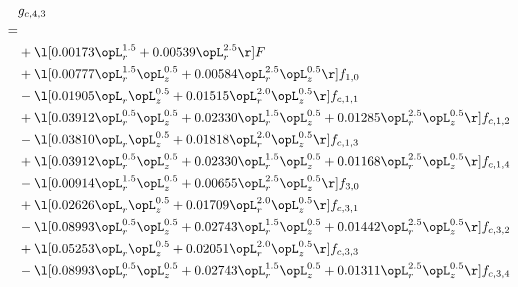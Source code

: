 \begin{alignat}{2} 
\label{eq:g_43_0} 
& g_{c,4,3} \nonumber \\ 
 = \\ 
& + \l[  0.00173 \opL_r^{1.5} +  0.00539 \opL_r^{2.5}  \r] F \nonumber \\ 
& + \l[  0.00777 \opL_r^{1.5} \opL_z^{0.5} +  0.00584 \opL_r^{2.5} \opL_z^{0.5}  \r] f_{1,0} \nonumber \\ 
& - \l[  0.01905 \opL_r \opL_z^{0.5} +  0.01515 \opL_r^{2.0} \opL_z^{0.5}  \r] f_{c,1,1} \nonumber \\ 
& + \l[  0.03912 \opL_r^{0.5} \opL_z^{0.5} +  0.02330 \opL_r^{1.5} \opL_z^{0.5} +  0.01285 \opL_r^{2.5} \opL_z^{0.5}  \r] f_{c,1,2} \nonumber \\ 
& - \l[  0.03810 \opL_r \opL_z^{0.5} +  0.01818 \opL_r^{2.0} \opL_z^{0.5}  \r] f_{c,1,3} \nonumber \\ 
& + \l[  0.03912 \opL_r^{0.5} \opL_z^{0.5} +  0.02330 \opL_r^{1.5} \opL_z^{0.5} +  0.01168 \opL_r^{2.5} \opL_z^{0.5}  \r] f_{c,1,4} \nonumber \\ 
& - \l[  0.00914 \opL_r^{1.5} \opL_z^{0.5} +  0.00655 \opL_r^{2.5} \opL_z^{0.5}  \r] f_{3,0} \nonumber \\ 
& + \l[  0.02626 \opL_r \opL_z^{0.5} +  0.01709 \opL_r^{2.0} \opL_z^{0.5}  \r] f_{c,3,1} \nonumber \\ 
& - \l[  0.08993 \opL_r^{0.5} \opL_z^{0.5} +  0.02743 \opL_r^{1.5} \opL_z^{0.5} +  0.01442 \opL_r^{2.5} \opL_z^{0.5}  \r] f_{c,3,2} \nonumber \\ 
& + \l[  0.05253 \opL_r \opL_z^{0.5} +  0.02051 \opL_r^{2.0} \opL_z^{0.5}  \r] f_{c,3,3} \nonumber \\ 
& - \l[  0.08993 \opL_r^{0.5} \opL_z^{0.5} +  0.02743 \opL_r^{1.5} \opL_z^{0.5} +  0.01311 \opL_r^{2.5} \opL_z^{0.5}  \r] f_{c,3,4} \nonumber \\ 
\end{alignat} 


